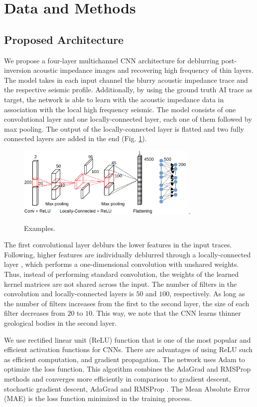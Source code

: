 \documentclass[journal]{IEEEtran}
\begin{document}
\section{Data and Methods}\label{Method}

\subsection{Proposed Architecture}

We propose a four-layer multichannel CNN architecture for deblurring
post-inversion acoustic impedance images and recovering high
frequency of thin layers. The model takes in each input channel the
blurry acoustic impedance trace and the respective seismic
profile. Additionally, by using the ground truth AI trace as
target, the network is able to learn with the acoustic
impedance data in association with the local high frequency seismic.
The model consists of one convolutional layer and one locally-connected
layer, each one of them followed by max pooling. The output of the
locally-connected layer is flatted and two fully connected layers are
added in the end (Fig. \ref{fig_model}).
\begin{figure}[!t]
\centering
\includegraphics[width=3.4in]{Figs/model}
\DeclareGraphicsExtensions.
\caption{Examples.}
\label{fig_model}
\end{figure}

The first convolutional layer deblurs the lower features in
the input traces. Following, higher features are individually
deblurred through a locally-connected layer \cite{},
which performs a one-dimensional convolution
with unshared weights. Thus, instead of performing standard
convolution, the weights of the learned kernel matrices are not
shared across the input. The number of filters in the convolution
and locally-connected layers is $50$ and $100$, respectively.
As long as the number of filters increases from the first to the
second layer, the size of each filter decreases from $20$ to $10$.
This way, we note that the CNN learns thinner geological
bodies in the second layer.

We use rectified linear unit (ReLU) function that is one
of the most popular and efficient activation functions for
CNNs. There are advantages of using ReLU such as efficient
computation, and gradient propagation. The network uses
Adam to optimize the loss function. This algorithm
combines the AdaGrad and RMSProp methods and converges more efficiently in
comparison to gradient descent, stochastic gradient descent, AdaGrad
and RMSProp \cite{Kingma2014}. The Mean Absolute Error (MAE) is the
loss function minimized in the training process.
\end{document}
